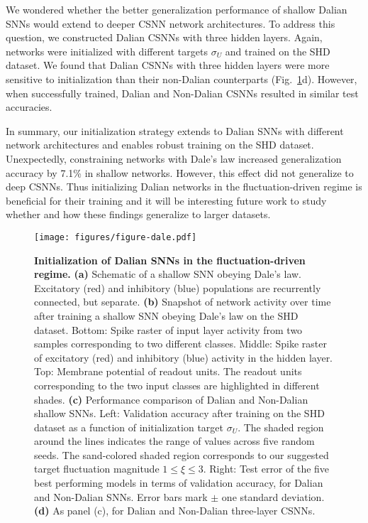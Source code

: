 \documentclass[11pt,a4paper]{article}
\begin{document}
We wondered whether the better generalization performance of shallow Dalian \acp{SNN} would extend to deeper \ac{CSNN} network architectures. 
To address this question, we constructed Dalian \acp{CSNN} with three hidden layers. 
Again, networks were initialized with different targets $\sigma_U$ and trained on the SHD dataset.
We found that Dalian \acp{CSNN} with three hidden layers were more sensitive to initialization than their non-Dalian counterparts (Fig.~\ref{fig:dale}d).
However, when successfully trained, Dalian and Non-Dalian \acp{CSNN} resulted in similar test accuracies. 

In summary, our initialization strategy extends to Dalian \acp{SNN} with different network architectures and enables robust training on the SHD dataset.
Unexpectedly, constraining networks with Dale's law increased generalization accuracy by 7.1\% in shallow networks. 
However, this effect did not generalize to deep \acp{CSNN}. 
Thus initializing Dalian networks in the fluctuation-driven regime is beneficial for their training and it will be interesting future work to study whether and how these findings generalize to larger datasets.

\begin{figure}[bt]
    \centering
    \texttt{[image: figures/figure-dale.pdf]}
    \caption{\textbf{Initialization of Dalian \acp{SNN} in the fluctuation-driven regime.} 
    \textbf{(a)} Schematic of a shallow \ac{SNN} obeying Dale's law. 
    Excitatory (red) and inhibitory (blue) populations are recurrently connected, but separate. 
    \textbf{(b)} Snapshot of network activity over time after training a shallow \ac{SNN} obeying Dale's law on the SHD dataset. 
    Bottom: Spike raster of input layer activity from two samples corresponding to two different classes.
    Middle: Spike raster of excitatory (red) and inhibitory (blue) activity in the hidden layer.
    Top: Membrane potential of readout units. The readout units corresponding to the two input classes are highlighted in different shades.
    \textbf{(c)} Performance comparison of Dalian and Non-Dalian shallow \acp{SNN}. 
    Left: Validation accuracy after training on the SHD dataset as a function of initialization target $\sigma_U$. The shaded region around the lines indicates the range of values across five random seeds. The sand-colored shaded region corresponds to our suggested target fluctuation magnitude $ 1\le \xi \le 3$.
    Right: Test error of the five best performing models in terms of validation accuracy, for Dalian and Non-Dalian \acp{SNN}. 
    Error bars mark $\pm$ one standard deviation.
    \textbf{(d)} As panel (c), for Dalian and Non-Dalian three-layer \acp{CSNN}.
    }
    \label{fig:dale}
\end{figure}
\end{document}
